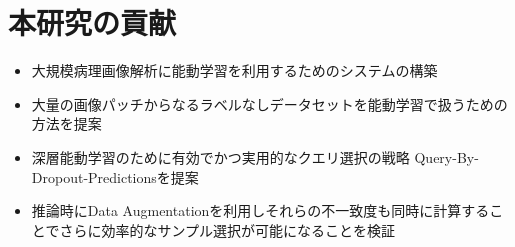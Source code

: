 \section{本研究の貢献}
\begin{itemize}
    \item 大規模病理画像解析に能動学習を利用するためのシステムの構築
    \item 大量の画像パッチからなるラベルなしデータセットを能動学習で扱うための方法を提案
    \item 深層能動学習のために有効でかつ実用的なクエリ選択の戦略 Query-By-Dropout-Predictionsを提案
    \item 推論時にData Augmentationを利用しそれらの不一致度も同時に計算することでさらに効率的なサンプル選択が可能になることを検証
\end{itemize}
